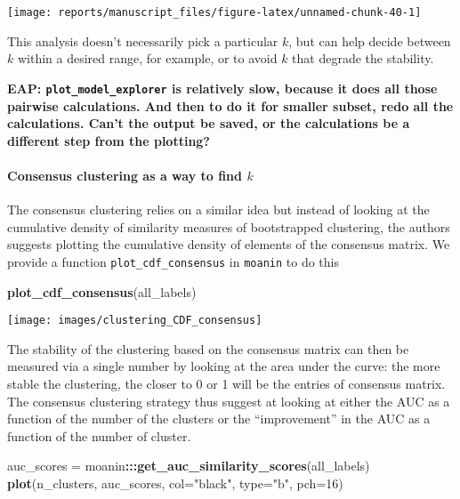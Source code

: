 \documentclass[9pt,a4paper,]{extarticle}
\newenvironment{Shaded}{\begin{snugshade}}{\end{snugshade}}
\newcommand{\DataTypeTok}[1]{\textcolor[rgb]{0.13,0.29,0.53}{#1}}
\newcommand{\DecValTok}[1]{\textcolor[rgb]{0.00,0.00,0.81}{#1}}
\newcommand{\KeywordTok}[1]{\textcolor[rgb]{0.13,0.29,0.53}{\textbf{#1}}}
\newcommand{\NormalTok}[1]{#1}
\newcommand{\OperatorTok}[1]{\textcolor[rgb]{0.81,0.36,0.00}{\textbf{#1}}}
\newcommand{\StringTok}[1]{\textcolor[rgb]{0.31,0.60,0.02}{#1}}
\begin{document}
\begin{center}\texttt{[image: reports/manuscript\_files/figure-latex/unnamed-chunk-40-1]} \end{center}

This analysis doesn't necessarily pick a particular \(k\), but can help decide between \(k\) within a desired range, for example, or to avoid \(k\) that degrade the stability.

\textbf{EAP: \texttt{plot\_model\_explorer} is relatively slow, because it does all those pairwise calculations. And then to do it for smaller subset, redo all the calculations. Can't the output be saved, or the calculations be a different step from the plotting?}

\hypertarget{consensus-clustering-as-a-way-to-find-k}{%
\paragraph{\texorpdfstring{Consensus clustering as a way to find \(k\)}{Consensus clustering as a way to find k}}\label{consensus-clustering-as-a-way-to-find-k}}

The consensus clustering \citep{monti:consensus} relies on a similar idea but
instead of looking at the cumulative density of similarity measures of
bootstrapped clustering, the authors suggests plotting the cumulative density
of elements of the consensus matrix. We provide a function
\texttt{plot\_cdf\_consensus} in \texttt{moanin} to do this

\begin{Shaded}
\begin{Highlighting}[]
\KeywordTok{plot_cdf_consensus}\NormalTok{(all_labels)}
\end{Highlighting}
\end{Shaded}

\begin{center}\texttt{[image: images/clustering\_CDF\_consensus]} \end{center}

The stability of the clustering based on the consensus matrix can then be
measured via a single number by looking at the area under the curve: the more
stable the clustering, the closer to 0 or 1 will be the entries of consensus
matrix. The consensus clustering strategy thus suggest at looking at either
the AUC as a function of the number of the clusters or the ``improvement'' in
the AUC as a function of the number of cluster.

\begin{Shaded}
\begin{Highlighting}[]
\NormalTok{auc_scores =}\StringTok{ }\NormalTok{moanin}\OperatorTok{:::}\KeywordTok{get_auc_similarity_scores}\NormalTok{(all_labels)}
\KeywordTok{plot}\NormalTok{(n_clusters, auc_scores, }\DataTypeTok{col=}\StringTok{"black"}\NormalTok{, }\DataTypeTok{type=}\StringTok{"b"}\NormalTok{, }\DataTypeTok{pch=}\DecValTok{16}\NormalTok{)}
\end{Highlighting}
\end{Shaded}
\end{document}
